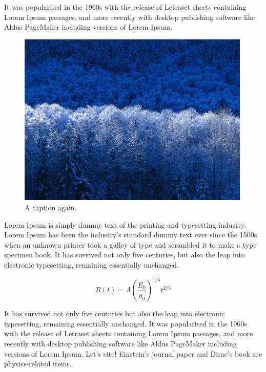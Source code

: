 \documentclass[final]{beamer}
\begin{document}
\begin{poster}
It was popularised in the 1960s with the release of Letraset sheets containing Lorem Ipsum passages, and more recently with desktop publishing software like Aldus PageMaker including versions of Lorem Ipsum.

\begin{figure}
    \centering
    \includegraphics[width=0.99\textwidth]{flames/pic2.png}
    \caption{\sffamily A caption again.}
\end{figure}

Lorem Ipsum is simply dummy text of the printing and typesetting industry. Lorem Ipsum has been the industry's standard dummy text ever since the 1500s, when an unknown printer took a galley of type and scrambled it to make a type specimen book. It has survived not only five centuries, but also the leap into electronic typesetting, remaining essentially unchanged.

\begin{equation*}
R(t)= A \left(\frac{E_0}{\rho_0}\right)^{1/5}t^{2/5}
\end{equation*}

\newcolumn
\justifying It has survived not only five centuries but also the leap into electronic typesetting, remaining essentially unchanged. It was popularised in the 1960s with the release of Letraset sheets containing Lorem Ipsum passages, and more recently with desktop publishing software like Aldus PageMaker including versions of Lorem Ipsum.  Let's cite! Einstein's journal paper \cite{einstein} and Dirac's book \cite{dirac} are physics-related items. 



\end{poster}
\end{document}
